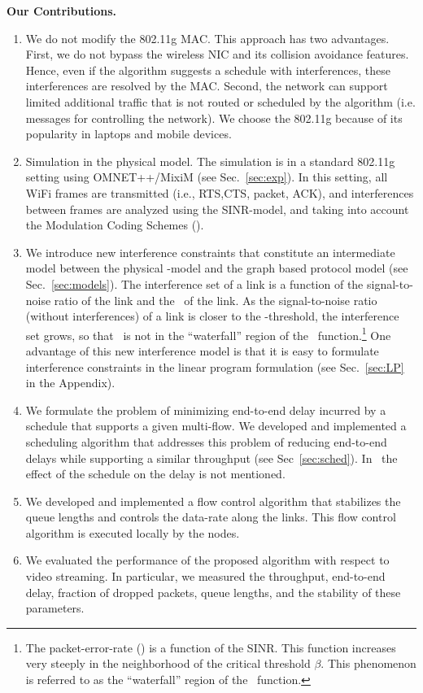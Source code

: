 \documentclass[11pt]{article}
\newenvironment{proof sketch}[1]{\noindent {\emph{Proof sketch of #1:}}}{\hfill \qed}
\newcommand{\SINR}{\text{\sc{sinr}}}
\newcommand{\PER}{\text{\sc{per}}}
\newcommand{\MCS}{\text{\sc{mcs}}}
\begin{document}
\medskip
\noindent
\textbf{Our Contributions.}
\begin{enumerate}
\item We do not modify the 802.11g MAC. This approach has two
  advantages. First, we do not bypass the wireless NIC and its
  collision avoidance features. Hence, even if the algorithm suggests
  a schedule with interferences, these interferences are resolved by
  the MAC. Second, the network can support limited additional traffic
  that is not routed or scheduled by the algorithm (i.e. messages for
  controlling the network). We choose the 802.11g because of its
  popularity in laptops and mobile devices.
\item Simulation in the physical model. The simulation is in a
  standard 802.11g setting using OMNET++/MixiM (see
  Sec.~\ref{sec:exp}).  In this setting, all WiFi frames are
  transmitted (i.e., RTS,CTS, packet, ACK), and interferences between
  frames are analyzed using the SINR-model, and taking into account
  the Modulation Coding Schemes (\MCS).
\item We introduce new interference constraints that constitute an
  intermediate model between the physical \SINR-model and the graph
  based protocol model (see Sec.~\ref{sec:models}). The interference
  set of a link is a function of the signal-to-noise ratio of the link
  and the \MCS\ of the link.  As the signal-to-noise ratio (without
  interferences) of a link is closer to the \SINR-threshold, the
  interference set grows, so that \SINR\ is not in the ``waterfall''
  region of the \PER\ function.\footnote{The packet-error-rate (\PER)
    is a function of the SINR. This function increases very steeply in
    the neighborhood of the critical threshold $\beta$. This
    phenomenon is referred to as the ``waterfall'' region of the \PER\
    function.  }  One advantage of this new interference model is that
  it is easy to formulate interference constraints in the linear
  program formulation (see Sec.~\ref{sec:LP} in the Appendix).
\item We formulate the problem of minimizing end-to-end delay incurred
  by a schedule that supports a given multi-flow. We developed and
  implemented a scheduling algorithm that addresses this problem of
  reducing end-to-end delays while supporting a similar throughput
  (see Sec~\ref{sec:sched}).
  In~\cite{kumar2005algorithmic,alicherry2005joint11,buragohain2007improved}
  the effect of the schedule on the delay is not mentioned.
\item We developed and implemented a flow control algorithm that
  stabilizes the queue lengths and controls the data-rate along the
  links.  This flow control algorithm is executed locally by the
  nodes.
\item We evaluated the performance of the proposed algorithm with
  respect to video streaming. In particular, we measured the
  throughput, end-to-end delay, fraction of dropped packets, queue
  lengths, and the stability of these parameters.
\end{enumerate}
\end{document}
